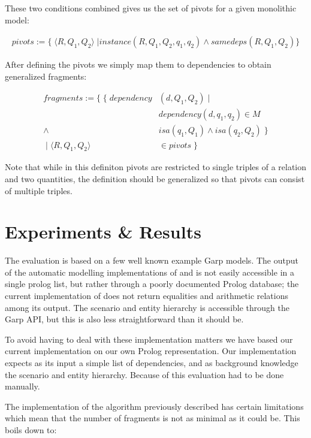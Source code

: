 \documentclass{article}
\begin{document}
These two conditions combined gives us the set of pivots for a given monolithic model:

\begin{align*}
pivots := \{ \; \langle R, Q_1, Q_2 \rangle \; | instance(R, Q_1, Q_2, q_1, q_2) \land samedeps(R, Q_1, Q_2) \} 
\end{align*}

After defining the pivots we simply map them to dependencies to obtain generalized fragments:

\begin{align*}
fragments := \{ \; \{ \; dependency&(d, Q_1, Q_2) \; | \; \\
		& dependency(d, q_1, q_2)  \in M \\
		\land \; & isa(q_1, Q_1)  \land isa(q_2, Q_2) \; \} \\
	\; | \; \langle R, Q_1, Q_2 \rangle &\in pivots \; \}
\end{align*}

Note that while in this definiton pivots are restricted to single triples of a
relation and two quantities, the definition should be generalized so that
pivots can consist of multiple triples.

\section{Experiments \& Results}

The evaluation is based on a few well known example Garp models. The output of
the automatic modelling implementations of \cite{buisman} and \cite{vanweelden}
is not easily accessible in a single prolog list, but rather through a poorly
documented Prolog database; the current implementation of \cite{vanweelden}
does not return equalities and arithmetic relations among its output. The
scenario and entity hierarchy is accessible through the Garp API, but this is
also less straightforward than it should be. 

To avoid having to deal with these implementation matters we have based our
current implementation on our own Prolog representation. Our implementation
expects as its input a simple list of dependencies, and as background knowledge
the scenario and entity hierarchy. Because of this evaluation had to be done
manually.

The implementation of the algorithm previously described has certain
limitations which mean that the number of fragments is not as minimal as it
could be. This boils down to:
\end{document}
